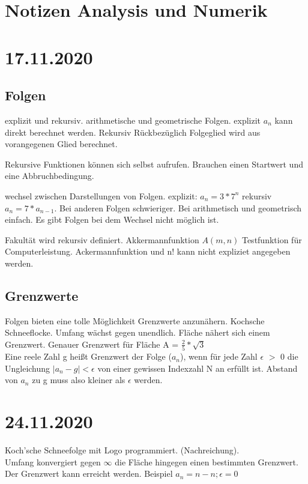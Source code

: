 \documentclass{article}
\begin{document}
	
	\section*{Notizen Analysis und Numerik}
	\section*{17.11.2020}
	\subsection*{Folgen}
	explizit und rekursiv.
	arithmetische und geometrische Folgen.
	explizit $a_n$ kann direkt berechnet werden. Rekursiv Rückbezüglich Folgeglied wird aus vorangegenen Glied berechnet. \linebreak
	
	Rekursive Funktionen können sich selbst aufrufen. Brauchen einen Startwert und eine Abbruchbedingung. \linebreak
	
	wechsel zwischen Darstellungen von Folgen. explizit: $a_n = 3 * 7^n$ rekursiv $a_n = 7 * a_{n-1}$. Bei anderen Folgen schwieriger. Bei arithmetisch und geometrisch einfach. Es gibt Folgen bei dem Wechsel nicht möglich ist. \linebreak
	
	Fakultät wird rekursiv definiert. Akkermannfunktion $A(m,n)$ Testfunktion für Computerleistung. Ackermannfunktion und n! kann nicht expliziet angegeben werden. \linebreak
	
	\subsection*{Grenzwerte}
	Folgen bieten eine tolle Möglichkeit Grenzwerte anzunähern. Kochsche Schneeflocke. Umfang wächst gegen unendlich. Fläche nähert sich einem Grenzwert. Genauer Grenzwert für Fläche A = $\frac{2}{5} * \sqrt{3}$ \\
	Eine reele Zahl g heißt Grenzwert der Folge ($a_n$), wenn für jede Zahl $\epsilon$ $>$ 0 die Ungleichung $|a_n -g| < \epsilon$ von einer gewissen Indexzahl N an erfüllt ist. Abstand von $a_n$ zu g muss also kleiner als $\epsilon$ werden. \\
	\section*{24.11.2020}
	Koch'sche Schneefolge mit Logo programmiert. (Nachreichung).  \\
	Umfang konvergiert gegen $\infty$ die Fläche hingegen einen bestimmten Grenzwert. \\
	Der Grenzwert kann erreicht werden. Beispiel $a_{n} = n - n; \epsilon = 0$
\end{document}
